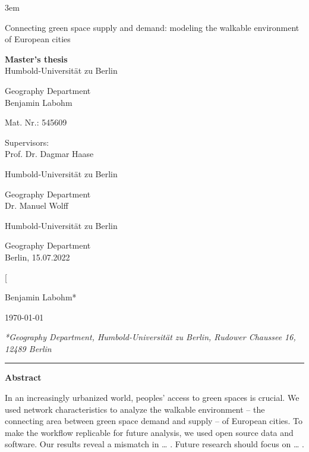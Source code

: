 \documentclass[10pt]{article}
\begin{document}
\emergencystretch 3em
\onecolumn

{\center
\vspace*{5cm}
{\Huge Connecting green space supply and demand: modeling the walkable environment of European cities}
\par\bigskip
\Large{
\textbf{Master's thesis}\\
Humbold-Universit\"at zu Berlin

Geography Department
\\
Benjamin Labohm

Mat. Nr.: 
545609
\vfill
}
}
\large{


Supervisors: \\
Prof. Dr. Dagmar Haase

Humbold-Universit\"at zu Berlin

Geography Department\\


Dr. Manuel Wolff

Humbold-Universit\"at zu Berlin

Geography Department \\

Berlin, 15.07.2022
}

\newpage
\normalsize
\tableofcontents
\newpage
\listoffigures
\newpage

\twocolumn[{\vspace{3ex}
	{\large Benjamin Labohm*\par}\vspace{2ex}
	\today\par\vspace{4ex}}
\textit{\small{*Geography Department, Humbold-Universit\"at zu Berlin, Rudower Chaussee 16, 12489 Berlin}} \\
\smallbreak
\hrule 

\vspace*{.5cm}

\textbf{Abstract}

In an increasingly urbanized world, peoples’ access to green spaces is crucial. We used network characteristics to analyze the walkable environment – the connecting area between green space demand and supply – of European cities. To make the workflow replicable for future analysis, we used open source data and software. Our results reveal a mismatch in … . Future research should focus on … .
\end{document}
